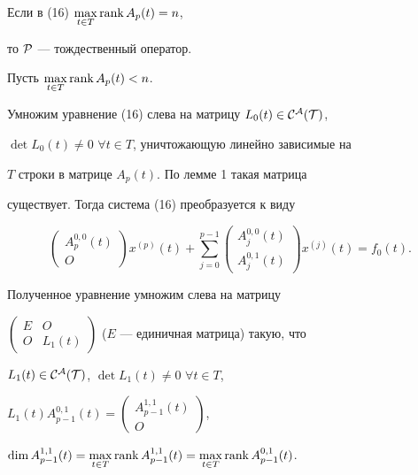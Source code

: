 \begin{pf}


Если в (16) $\max\limits_{t \in T} \operatorname{rank} A_p(t)=n$,


то $\cal P$ --- тождественный оператор. 


Пусть $\max\limits_{t \in T} \operatorname{rank} A_p(t) < n$.


Умножим уравнение (16) слева на матрицу $L_0(t) \in \cal C^A(T)$,


$\det L_0(t) \ne 0$ \; $\forall t \in T$, уничтожающую линейно зависимые на


$T$ строки в матрице $A_p(t)$. По лемме 1 такая матрица


существует. Тогда система (16) преобразуется к виду


$$


\begin{pmatrix}


A_p^{0,0}(t) \\ O 


\end{pmatrix} x^{(p)}(t)+\sum_{j=0}^{p-1}{


\begin{pmatrix}


A_j^{0,0}(t) \\ A_j^{0,1}(t) 


\end{pmatrix} x^{(j)}(t)}=f_0(t).


$$


Полученное уравнение умножим слева на матрицу


$\left(\begin{smallmatrix} E & O \\ O & L_1(t)


\end{smallmatrix}\right)$ ($E$ --- единичная матрица) такую, что 


$L_1(t) \in \cal C^A(T)$, $\det L_1(t) \ne 0$ \; $\forall t \in T$,


$L_1(t) A_{p-1}^{0,1}(t)= \left(\begin{smallmatrix}


A_{p-1}^{1,1}(t) \\ O \end{smallmatrix}\right)$,


$\dim A_{p-1}^{1,1}(t) = \max\limits_{t \in T}\rank A_{p-1}^{1,1}(t) =


\max\limits_{t \in T} \rank A_{p-1}^{0,1}(t)$.






\end{pf}
